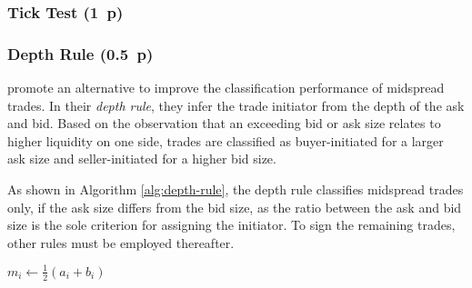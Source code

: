 \subsubsection{Tick Test (1~p)}\label{tick-test}




\subsubsection{Depth Rule (0.5~p)}\label{depth-rule}

\textcite{grauerOptionTradeClassification2022} promote an alternative to improve the classification performance of midspread trades. In their \textit{depth rule}, they infer the trade initiator from the depth of the ask and bid. Based on the observation that an exceeding bid or ask size relates to higher liquidity on one side, trades are classified as buyer-initiated for a larger ask size and seller-initiated for a higher bid size.

As shown in Algorithm \ref{alg:depth-rule}, the depth rule classifies midspread trades only, if the ask size differs from the bid size, as the ratio between the ask and bid size is the sole criterion for assigning the initiator. To sign the remaining trades, other rules must be employed thereafter.

\begin{algorithm}


  \caption{$\operatorname{\mathtt{depth}}$ \label{alg:depth-rule}}


  \BlankLine %

  $m_i \leftarrow \frac{1}{2}(a_i + b_i)$ 

\end{algorithm}

